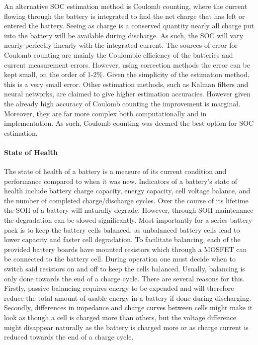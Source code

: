 \documentclass[a4paper]{article}
\begin{document}
An alternative SOC estimation method is Coulomb counting, where the current 
flowing through the battery is integrated to find the net charge that has 
left or entered the battery. Seeing as charge is a conserved quantity nearly 
all charge put into the battery will be available during discharge. As such, 
the SOC will vary nearly perfectly linearly with the integrated current. 
The sources of error for Coulomb counting are mainly the Coulombic efficiency 
of the batteries and current measurement errors. However, using correction 
methods the error can be kept small, on the order of 1-2\%\cite{NG20091506}. Given the 
simplicity of the estimation method, this is a very small error. Other 
estimation methods, such as Kalman filters and neural networks, are claimed 
to give higher estimation accuracies\cite{DANKO2019186}. However given the already high 
accuracy of Coulomb counting the improvement is marginal. Moreover, they 
are far more complex both computationally and in implementation. As such, 
Coulomb counting was deemed the best option for SOC estimation. 

\paragraph*{State of Health}
\vspace{-6pt}
The state of health of a battery is a measure of its current condition and 
performance compared to when it was new\cite{mpower}. Indicators of a battery’s 
state of health include battery charge capacity, energy capacity, cell voltage 
balance, and the number of completed charge/discharge 
cycles\cite{https://doi.org/10.1002/er.3598}. Over the course of its lifetime 
the SOH of a battery will naturally degrade. However, through SOH maintenance 
the degradation can be slowed significantly. Most importantly for a series 
battery pack is to keep the battery cells balanced, as unbalanced battery 
cells lead to lower capacity and faster cell degradation\cite{texas}. To 
facilitate balancing, each of the provided battery boards have mounted 
resistors which through a MOSFET can be connected to the battery cell. During 
operation one must decide when to switch said resistors on and off to keep the 
cells balanced. Usually, balancing is only done towards the end of a charge cycle. 
There are several reasons for this. Firstly, passive balancing requires energy 
to be expended and will therefore reduce the total amount of usable energy 
in a battery if done during discharging. Secondly, differences in impedance 
and charge curves between cells might make it look as though a cell is charged 
more than others, but the voltage difference might disappear naturally as the 
battery is charged more or as charge current is reduced towards the end of a 
charge cycle.
\end{document}
